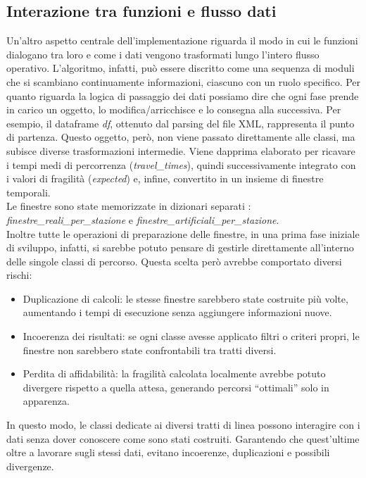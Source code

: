 \documentclass[a4paper,12pt]{report}
\begin{document}
\subsection{Interazione tra funzioni e flusso dati}
Un'altro aspetto centrale dell’implementazione riguarda il modo in cui le funzioni dialogano tra loro e come i dati vengono trasformati lungo l’intero flusso operativo. L’algoritmo, infatti, può essere discritto come una sequenza di moduli che si scambiano continuamente informazioni, ciascuno con un ruolo specifico.
Per quanto riguarda la logica di passaggio dei dati possiamo dire che ogni fase prende in carico un oggetto, lo modifica/arricchisce e lo consegna alla successiva.
Per esempio, il dataframe \textit{df}, ottenuto dal parsing del file XML, rappresenta il punto di partenza. Questo oggetto, però, non viene passato direttamente alle classi, ma subisce diverse trasformazioni intermedie. Viene dapprima elaborato per ricavare i tempi medi di percorrenza (\textit{travel\_times}), quindi successivamente integrato con i valori di fragilità (\textit{expected}) e, infine, convertito in un insieme di finestre temporali. \\ Le finestre sono state memorizzate in dizionari separati :  \textit{finestre\_reali\_per\_stazione} e \textit{finestre\_artificiali\_per\_stazione}. \\ Inoltre tutte le operazioni di preparazione delle finestre, in una prima fase iniziale di sviluppo, infatti, si sarebbe potuto pensare di gestirle direttamente all’interno delle singole classi di percorso. Questa scelta però avrebbe comportato diversi rischi:

\begin{itemize}
    \item Duplicazione di calcoli: le stesse finestre sarebbero state costruite più volte, aumentando i tempi di esecuzione senza aggiungere informazioni nuove.
    
    \item Incoerenza dei risultati: se ogni classe avesse applicato filtri o criteri propri, le finestre non sarebbero state confrontabili tra tratti diversi.
   
    \item Perdita di affidabilità: la fragilità calcolata localmente avrebbe potuto divergere rispetto a quella attesa, generando percorsi “ottimali” solo in apparenza.
\end{itemize}
In questo modo, le classi dedicate ai diversi tratti di linea possono interagire con i dati senza dover conoscere come sono stati costruiti. Garantendo che quest'ultime oltre a lavorare sugli stessi dati, evitano incoerenze, duplicazioni e possibili divergenze.
\end{document}
